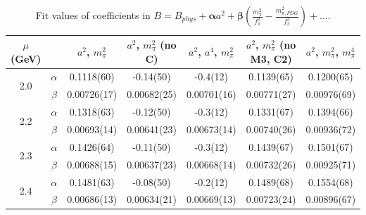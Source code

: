 \documentclass[12pt]{extarticle}
\begin{document}
\begin{table}[h!]
\begin{center}
\begin{tabular}{|c c|c|c|c|c|c|}
\hline
$\mu$ (GeV) &  & $a^2$, $m_\pi^2$& $a^2$, $m_\pi^2$ (no C)& $a^2$, $a^4$, $m_\pi^2$& $a^2$, $m_\pi^2$ (no M3, C2)& $a^2$, $m_\pi^2$, $m_\pi^4$\\
\hline
\multirow{2}{0.5in}{2.0} & $\alpha$ & 0.1118(60)& -0.14(50)& -0.4(12)& 0.1139(65)& 0.1200(65)\\
 & $\beta$ & 0.00726(17)& 0.00682(25)& 0.00701(16)& 0.00771(27)& 0.00976(69)\\
\hline
\multirow{2}{0.5in}{2.2} & $\alpha$ & 0.1318(63)& -0.12(50)& -0.3(12)& 0.1331(67)& 0.1394(66)\\
 & $\beta$ & 0.00693(14)& 0.00641(23)& 0.00673(14)& 0.00740(26)& 0.00936(72)\\
\hline
\multirow{2}{0.5in}{2.3} & $\alpha$ & 0.1426(64)& -0.11(50)& -0.3(12)& 0.1439(67)& 0.1501(67)\\
 & $\beta$ & 0.00688(15)& 0.00637(23)& 0.00668(14)& 0.00732(26)& 0.00925(71)\\
\hline
\multirow{2}{0.5in}{2.4} & $\alpha$ & 0.1481(63)& -0.08(50)& -0.2(12)& 0.1489(68)& 0.1554(68)\\
 & $\beta$ & 0.00686(13)& 0.00634(21)& 0.00669(13)& 0.00723(24)& 0.00896(67)\\
\hline
\end{tabular}
\caption{Fit values of coefficients in $B = B_{phys} + \mathbf{\alpha} a^2 + \mathbf{\beta}\left(\frac{m_\pi^2}{f_\pi^2}-\frac{m_{\pi,PDG}^2}{f_\pi^2}\right) + \ldots$.}
\end{center}
\end{table}




















\clearpage
\end{document}
